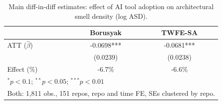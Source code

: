\begin{table}[t]
\centering
\caption{Main diff-in-diff estimates: effect of AI tool adoption on architectural smell density (log ASD).}
\label{tab:main_did}
\begin{tabular}{lcc}
\toprule
 & Borusyak & TWFE-SA \\
\midrule
ATT ($\hat{\beta}$) & -0.0698*** & -0.0681*** \\
 & (0.0239) & (0.0238) \\
Effect (\%) & -6.7\% & -6.6\% \\
\bottomrule
\multicolumn{3}{l}{\footnotesize $^{*}p<0.1$; $^{**}p<0.05$; $^{***}p<0.01$} \\
\multicolumn{3}{l}{\footnotesize Both: 1,811 obs., 151 repos, repo and time FE, SEs clustered by repo.} \\
\end{tabular}
\end{table}
